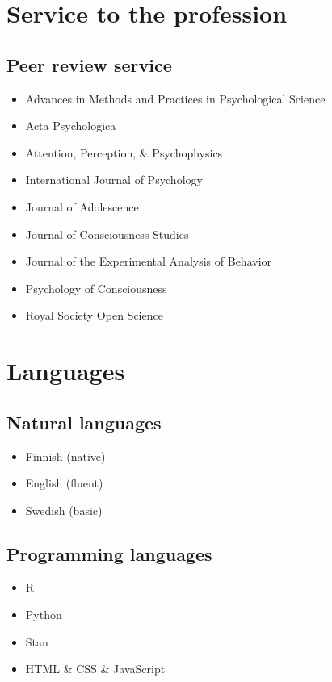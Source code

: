 \documentclass[12pt, a4paper]{article}
\begin{document}
\section*{Service to the profession}

\subsection*{Peer review service}
\begin{itemize}
\item Advances in Methods and Practices in Psychological Science
\item Acta Psychologica
\item Attention, Perception, \& Psychophysics
\item International Journal of Psychology
\item Journal of Adolescence
\item Journal of Consciousness Studies
\item Journal of the Experimental Analysis of Behavior
\item Psychology of Consciousness
\item Royal Society Open Science
\end{itemize}

\section*{Languages}
\begin{multicols}{2}
\subsection*{Natural languages}
\begin{itemize}
\item Finnish (native)
\item English (fluent)
\item Swedish (basic)
\end{itemize}
\vfill\null
\columnbreak
\subsection*{Programming languages}
\begin{itemize}
\item R
\item Python
\item Stan
\item HTML \& CSS \& JavaScript
\end{itemize}
\end{multicols}

\vfill{}
\end{document}
